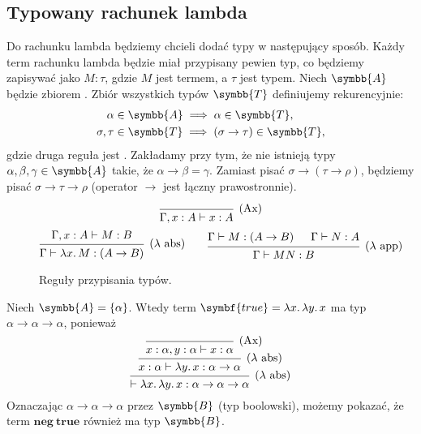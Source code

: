 \documentclass[polish,pretty,bibliography=totocnumbered]{angav}
\begin{document}
\subsection{Typowany rachunek lambda}

Do rachunku lambda będziemy chcieli dodać typy w następujący sposób. Każdy term rachunku lambda będzie miał przypisany pewien typ, co będziemy zapisywać jako $M : \tau$, gdzie $M$ jest termem, a $\tau$ jest typem. Niech $\symbb{A}$ będzie zbiorem . Zbiór wszystkich typów $\symbb{T}$ definiujemy rekurencyjnie:
\begin{align*}
    \alpha &\in \symbb{A} \implies \alpha \in \symbb{T}, \\
    \sigma, \tau &\in \symbb{T} \implies (\sigma \to \tau) \in \symbb{T},
\end{align*}
gdzie druga reguła jest . Zakładamy przy tym, że nie istnieją typy $\alpha, \beta, \gamma \in \symbb{A}$ takie, że $\alpha \to \beta = \gamma$. Zamiast pisać $\sigma \to (\tau \to \rho)$, będziemy pisać $\sigma \to \tau \to \rho$ (operator $\to$ jest łączny prawostronnie).

\begin{figure}[H]
    \[
    \begin{prooftree}
        \infer0[(Ax)]{\Gamma,x:A\vdash x:A}
    \end{prooftree}
    \]
    \[
    \begin{prooftree}
        \hypo{\Gamma,x:A\vdash M:B}
        \infer1[($\lambda$ abs)]{\Gamma\vdash \lambda x\ldotp M:(A\to B)}
    \end{prooftree}
    \qquad
    \begin{prooftree}
        \hypo{\Gamma\vdash M:(A \to B)}
        \hypo{\Gamma\vdash N:A}
        \infer2[($\lambda$ app)]{\Gamma\vdash MN:B}
    \end{prooftree}
    \]
    \caption{Reguły przypisania typów.}
\end{figure}

\begin{example}
    Niech $\symbb{A} = \{\alpha\}$. Wtedy term $\symbf{true} = \lambda x\ldotp \lambda y\ldotp x$ ma typ $\alpha \to \alpha \to \alpha$, ponieważ
    \[
    \begin{prooftree}
        \infer0[(Ax)]{x:\alpha,y:\alpha\vdash x:\alpha}
        \infer1[($\lambda$ abs)]{x:\alpha\vdash \lambda y\ldotp x:\alpha \to \alpha}
        \infer1[($\lambda$ abs)]{\vdash \lambda x\ldotp \lambda y\ldotp x:\alpha \to \alpha \to \alpha}
    \end{prooftree}
    \]
    Oznaczając $\alpha \to \alpha \to \alpha$ przez $\symbb{B}$ (typ boolowski), możemy pokazać, że term $\symbf{neg}\ \symbf{true}$ również ma typ $\symbb{B}$.
\end{example}
\end{document}
